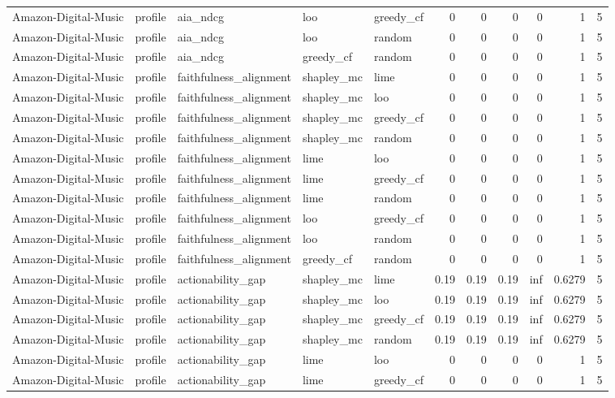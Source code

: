 \begin{table}[t]
{\begin{tabular}{lllllrrrrrr}
Amazon-Digital-Music & profile & aia\_ndcg & loo & greedy\_cf & 0 & 0 & 0 & 0 & 1 & 5 \\
Amazon-Digital-Music & profile & aia\_ndcg & loo & random & 0 & 0 & 0 & 0 & 1 & 5 \\
Amazon-Digital-Music & profile & aia\_ndcg & greedy\_cf & random & 0 & 0 & 0 & 0 & 1 & 5 \\
Amazon-Digital-Music & profile & faithfulness\_alignment & shapley\_mc & lime & 0 & 0 & 0 & 0 & 1 & 5 \\
Amazon-Digital-Music & profile & faithfulness\_alignment & shapley\_mc & loo & 0 & 0 & 0 & 0 & 1 & 5 \\
Amazon-Digital-Music & profile & faithfulness\_alignment & shapley\_mc & greedy\_cf & 0 & 0 & 0 & 0 & 1 & 5 \\
Amazon-Digital-Music & profile & faithfulness\_alignment & shapley\_mc & random & 0 & 0 & 0 & 0 & 1 & 5 \\
Amazon-Digital-Music & profile & faithfulness\_alignment & lime & loo & 0 & 0 & 0 & 0 & 1 & 5 \\
Amazon-Digital-Music & profile & faithfulness\_alignment & lime & greedy\_cf & 0 & 0 & 0 & 0 & 1 & 5 \\
Amazon-Digital-Music & profile & faithfulness\_alignment & lime & random & 0 & 0 & 0 & 0 & 1 & 5 \\
Amazon-Digital-Music & profile & faithfulness\_alignment & loo & greedy\_cf & 0 & 0 & 0 & 0 & 1 & 5 \\
Amazon-Digital-Music & profile & faithfulness\_alignment & loo & random & 0 & 0 & 0 & 0 & 1 & 5 \\
Amazon-Digital-Music & profile & faithfulness\_alignment & greedy\_cf & random & 0 & 0 & 0 & 0 & 1 & 5 \\
Amazon-Digital-Music & profile & actionability\_gap & shapley\_mc & lime & 0.19 & 0.19 & 0.19 & inf & 0.6279 & 5 \\
Amazon-Digital-Music & profile & actionability\_gap & shapley\_mc & loo & 0.19 & 0.19 & 0.19 & inf & 0.6279 & 5 \\
Amazon-Digital-Music & profile & actionability\_gap & shapley\_mc & greedy\_cf & 0.19 & 0.19 & 0.19 & inf & 0.6279 & 5 \\
Amazon-Digital-Music & profile & actionability\_gap & shapley\_mc & random & 0.19 & 0.19 & 0.19 & inf & 0.6279 & 5 \\
Amazon-Digital-Music & profile & actionability\_gap & lime & loo & 0 & 0 & 0 & 0 & 1 & 5 \\
Amazon-Digital-Music & profile & actionability\_gap & lime & greedy\_cf & 0 & 0 & 0 & 0 & 1 & 5 \\

\end{tabular}}
\end{table}
